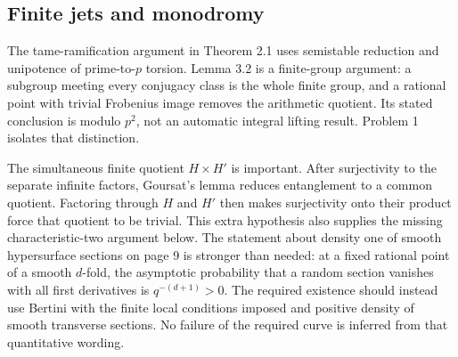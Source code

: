 \documentclass[10pt]{article}
\begin{document}
\subsection*{Finite jets and monodromy}
The tame-ramification argument in Theorem 2.1 uses semistable reduction and unipotence of prime-to-\(p\) torsion. Lemma 3.2 is a finite-group argument: a subgroup meeting every conjugacy class is the whole finite group, and a rational point with trivial Frobenius image removes the arithmetic quotient. Its stated conclusion is modulo \(p^2\), not an automatic integral lifting result. Problem 1 isolates that distinction.\par
The simultaneous finite quotient \(H\times H'\) is important. After surjectivity to the separate infinite factors, Goursat’s lemma reduces entanglement to a common quotient. Factoring through \(H\) and \(H'\) then makes surjectivity onto their product force that quotient to be trivial. This extra hypothesis also supplies the missing characteristic-two argument below. The statement about density one of smooth hypersurface sections on page 9 is stronger than needed: at a fixed rational point of a smooth \(d\)-fold, the asymptotic probability that a random section vanishes with all first derivatives is \(q^{-(d+1)}>0\). The required existence should instead use Bertini with the finite local conditions imposed and positive density of smooth transverse sections. No failure of the required curve is inferred from that quantitative wording.\par
\end{document}
